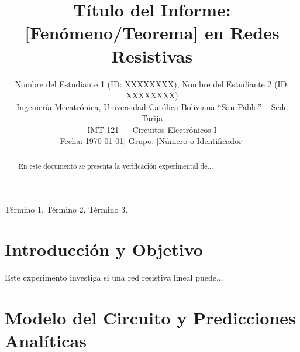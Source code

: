 \documentclass[journal, a4paper]{IEEEtran}
\begin{document}
\title{Título del Informe: [Fenómeno/Teorema] en Redes Resistivas}

\author{
    Nombre del Estudiante 1 (ID: XXXXXXXX), Nombre del Estudiante 2 (ID: XXXXXXXX)\\
    Ingeniería Mecatrónica, Universidad Católica Boliviana ``San Pablo'' -- Sede Tarija\\
    IMT-121 --- Circuitos Electrónicos I\\
    Fecha: \today \quad | \quad Grupo: [Número o Identificador]
}

\maketitle

\begin{abstract}
En este documento se presenta la verificación experimental de...
\end{abstract}

\begin{IEEEkeywords}
Término 1, Término 2, Término 3. %
\end{IEEEkeywords}

\section{Introducción y Objetivo}
Este experimento investiga si una red resistiva lineal puede...

\section{Modelo del Circuito y Predicciones Analíticas}
\end{document}
